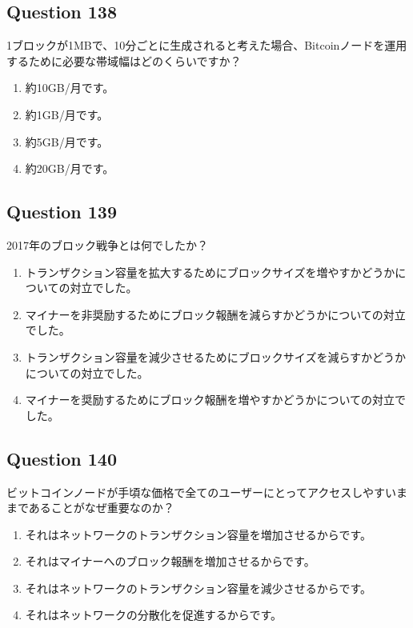 \documentclass[12pt,a4paper]{article}
\begin{document}
\bigskip


\subsection*{Question 138}
1ブロックが1MBで、10分ごとに生成されると考えた場合、Bitcoinノードを運用するために必要な帯域幅はどのくらいですか？

\begin{enumerate}[label=\Alph*., leftmargin=*]
\item 約10GB/月です。
\item 約1GB/月です。
\item 約5GB/月です。
\item 約20GB/月です。
\end{enumerate}

\bigskip


\subsection*{Question 139}
2017年のブロック戦争とは何でしたか？

\begin{enumerate}[label=\Alph*., leftmargin=*]
\item トランザクション容量を拡大するためにブロックサイズを増やすかどうかについての対立でした。
\item マイナーを非奨励するためにブロック報酬を減らすかどうかについての対立でした。
\item トランザクション容量を減少させるためにブロックサイズを減らすかどうかについての対立でした。
\item マイナーを奨励するためにブロック報酬を増やすかどうかについての対立でした。
\end{enumerate}

\bigskip


\subsection*{Question 140}
ビットコインノードが手頃な価格で全てのユーザーにとってアクセスしやすいままであることがなぜ重要なのか？

\begin{enumerate}[label=\Alph*., leftmargin=*]
\item それはネットワークのトランザクション容量を増加させるからです。
\item それはマイナーへのブロック報酬を増加させるからです。
\item それはネットワークのトランザクション容量を減少させるからです。
\item それはネットワークの分散化を促進するからです。
\end{enumerate}
\end{document}
